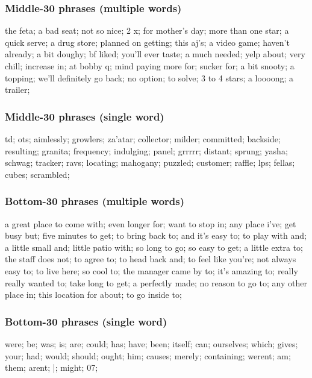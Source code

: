 \documentclass[11pt]{article}
\begin{document}
\subsubsection*{Middle-30 phrases (multiple words)}
the feta;
a bad seat;
not so nice;
2 x;
for mother's day;
more than one star;
a quick serve;
a drug store;
planned on getting;
this aj's;
a video game;
haven't already;
a bit doughy;
bf liked;
you'll ever taste;
a much needed;
yelp about;
very chill;
increase in;
at bobby q;
mind paying more for;
sucker for;
a bit snooty;
a topping;
we'll definitely go back;
no option;
to solve;
3 to 4 stars;
a loooong;
a trailer;
\subsubsection*{Middle-30 phrases (single word)}
td;
ots;
aimlessly;
growlers;
za'atar;
collector;
milder;
committed;
backside;
resulting;
granita;
frequency;
indulging;
panel;
grrrrr;
distant;
sprung;
yasha;
schwag;
tracker;
ravs;
locating;
mahogany;
puzzled;
customer;
raffle;
lps;
fellas;
cubes;
scrambled;
\subsubsection*{Bottom-30 phrases (multiple words)}
a great place to come with;
even longer for;
want to stop in;
any place i've;
get busy but;
five minutes to get;
to bring back to;
and it's easy to;
to play with and;
a little small and;
little patio with;
so long to go;
so easy to get;
a little extra to;
the staff does not;
to agree to;
to head back and;
to feel like you're;
not always easy to;
to live here;
so cool to;
the manager came by to;
it's amazing to;
really really wanted to;
take long to get;
a perfectly made;
no reason to go to;
any other place in;
this location for about;
to go inside to;
\subsubsection*{Bottom-30 phrases (single word)}
were;
be;
was;
is;
are;
could;
has;
have;
been;
itself;
can;
ourselves;
which;
gives;
your;
had;
would;
should;
ought;
him;
causes;
merely;
containing;
werent;
am;
them;
arent;
|;
might;
07;
\end{document}
